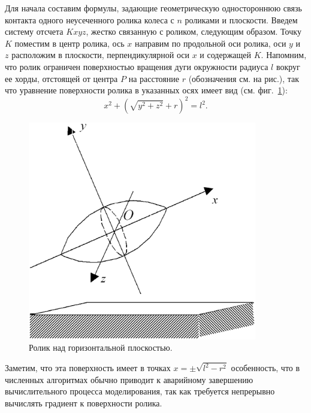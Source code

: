 
\label{sec3}
Для начала составим формулы, задающие геометрическую одностороннюю связь контакта одного неусеченного ролика колеса с $n$ роликами и плоскости. Введем систему отсчета $Kxyz$, жестко связанную с роликом, следующим образом. Точку $K$ поместим в центр ролика, ось $x$ направим по продольной оси ролика, оси $y$ и $z$ расположим в плоскости, перпендикулярной оси $x$ и содержащей $K$. Напомним, что ролик ограничен поверхностью вращения дуги окружности радиуса $l$ вокруг ее хорды, отстоящей от центра $P$ на расстояние $r$ (обозначения см. на рис.), так что уравнение поверхности ролика в указанных осях имеет вид (см. фиг.~\ref{Roller}):
\begin{equation}
    x^2 + \left( \sqrt{ y^2 + z^2 } + r \right)^2 = l^2.
\end{equation}

\begin{figure}[htb]
\centering\includegraphics[width=10cm]{content/parts/3_friction/nd/Roller.eps}
\caption{Ролик над горизонтальной плоскостью.}
\label{Roller}
\end{figure}

Заметим, что эта поверхность имеет  в 
точках $x=\pm \sqrt{l^2 - r^2}$ особенность, что в численных алгоритмах обычно приводит к аварийному завершению вычислительного процесса моделирования, так как требуется непрерывно вычислять градиент к поверхности ролика.

